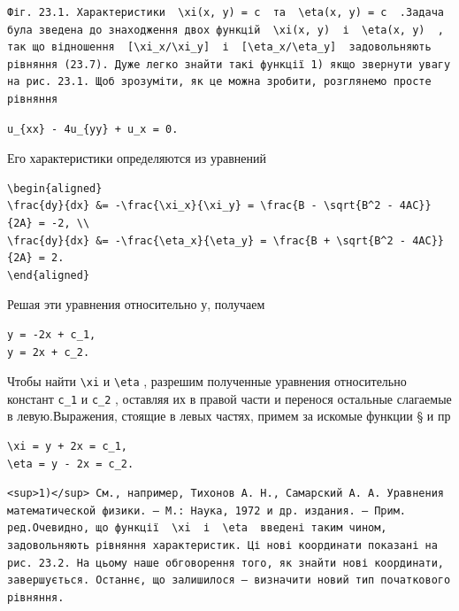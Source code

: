 \documentclass[
  ukrainian,
]{article}
\begin{document}
\begin{verbatim}
Фіг. 23.1. Характеристики  \xi(x, y) = c  та  \eta(x, y) = c  .Задача була зведена до знаходження двох функцій  \xi(x, y)  і  \eta(x, y)  , так що відношення  [\xi_x/\xi_y]  і  [\eta_x/\eta_y]  задовольняють рівняння (23.7). Дуже легко знайти такі функції 1) якщо звернути увагу на рис. 23.1. Щоб зрозуміти, як це можна зробити, розглянемо просте рівняння
\end{verbatim}

\begin{verbatim}
u_{xx} - 4u_{yy} + u_x = 0.
\end{verbatim}

Его характеристики определяются из уравнений

\begin{verbatim}
\begin{aligned}
\frac{dy}{dx} &= -\frac{\xi_x}{\xi_y} = \frac{B - \sqrt{B^2 - 4AC}}{2A} = -2, \\
\frac{dy}{dx} &= -\frac{\eta_x}{\eta_y} = \frac{B + \sqrt{B^2 - 4AC}}{2A} = 2.
\end{aligned}
\end{verbatim}

Решая эти уравнения относительно у, получаем

\begin{verbatim}
y = -2x + c_1,
y = 2x + c_2.
\end{verbatim}

Чтобы найти \texttt{\textbackslash{}xi} и \texttt{\textbackslash{}eta} ,
разрешим полученные уравнения относительно констант \texttt{c\_1} и
\texttt{c\_2} , оставляя их в правой части и перенося остальные
слагаемые в левую.Выражения, стоящие в левых частях, примем за искомые
функции § и пр

\begin{verbatim}
\xi = y + 2x = c_1,
\eta = y - 2x = c_2.
\end{verbatim}

\begin{verbatim}
<sup>1)</sup> См., например, Тихонов А. Н., Самарский А. А. Уравнения математической физики. — М.: Наука, 1972 и др. издания. — Прим. ред.Очевидно, що функції  \xi  і  \eta  введені таким чином, задовольняють рівняння характеристик. Ці нові координати показані на рис. 23.2. На цьому наше обговорення того, як знайти нові координати, завершується. Останнє, що залишилося — визначити новий тип початкового рівняння.
\end{verbatim}
\end{document}
